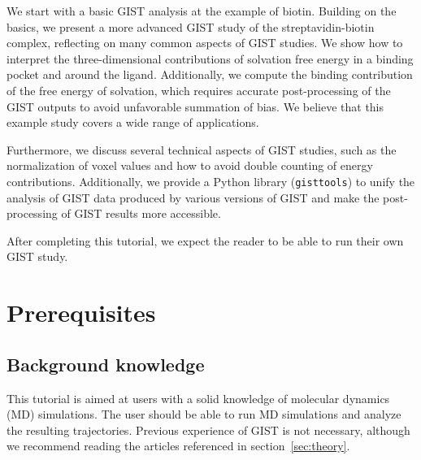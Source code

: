 \documentclass[9pt,tutorial]{livecoms}
\newcommand{\software}{\texttt}
\begin{document}
We start with a basic GIST analysis at the example of biotin.
Building on the basics, we present a more advanced GIST study of the streptavidin-biotin complex, reflecting on many common aspects of GIST studies.
We show how to interpret the three-dimensional contributions of solvation free energy in a binding pocket and around the ligand.
Additionally, we compute the binding contribution of the free energy of solvation, which requires accurate post-processing of the GIST outputs to avoid unfavorable summation of bias.
We believe that this example study covers a wide range of applications.

Furthermore, we discuss several technical aspects of GIST studies, such as the normalization of voxel values and how to avoid double counting of energy contributions. 
Additionally, we provide a Python library (\software{gisttools}) to unify the analysis of GIST data produced by various versions of GIST and make the post-processing of GIST results more accessible.

After completing this tutorial, we expect the reader to be able to run their own GIST study. 

%

\section{Prerequisites}


\subsection{Background knowledge}
This tutorial is aimed at users with a solid knowledge of molecular dynamics (MD) simulations.
The user should be able to run MD simulations and analyze the resulting trajectories.
Previous experience of GIST is not necessary, although we recommend reading the articles referenced in section~\ref{sec:theory}.
\end{document}
